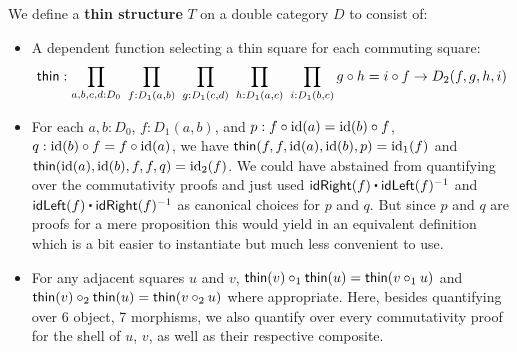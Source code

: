 \begin{defn}
We define a \textbf{thin structure} $T$ on a double category $D$ to consist of:
\begin{itemize}
\item A dependent function selecting a thin square for each commuting square:
\begin{equation*}
\mathsf{thin} : \prod_{a,b,c,d:D_0} ~ \prod_{f:D_1(a,b)} ~ \prod_{g:D_1(c,d)}
	~ \prod_{h:D_1(a,c)} ~ \prod_{i:D_1(b,c)} g \circ h = i \circ f \to
	D_2(f,g,h,i)
\end{equation*}
\item For each $a,b:D_0$, $f:D_1(a,b)$, and $p : f \circ \operatorname{id}(a) = \operatorname{id}(b) \circ f$,
$q : \operatorname{id}(b) \circ f = f \circ \operatorname{id}(a)$, we have $\mathsf{thin}(f,f,\operatorname{id}(a),\operatorname{id}(b),p) =
\operatorname{id}_1(f)$ and $\mathsf{thin}(\operatorname{id}(a),\operatorname{id}(b),f,f,q) = \operatorname{id}_2(f)$.
We could have abstained from quantifying over the commutativity proofs and just
used $\idRight(f) \ct \idLeft(f)\inv$ and $\idLeft(f) \ct \idRight(f)\inv$ as
canonical choices for $p$ and $q$.
But since $p$ and $q$ are proofs for a mere proposition this would yield in an
equivalent definition which is a bit easier to instantiate but much less
convenient to use.
\item For any adjacent squares $u$ and $v$, $\mathsf{thin}(v) \circ_1 \mathsf{thin}(u)
= \mathsf{thin}(v \circ_1 u)$ and $\mathsf{thin}(v) \circ_2 \mathsf{thin}(u) = \mathsf{thin}(v \circ_2 u)$ where
appropriate.
Here, besides quantifying over 6 object, 7 morphisms, we also quantify over
every commutativity proof for the shell of $u$, $v$, as well as their respective
composite.
\end{itemize}
\end{defn}

